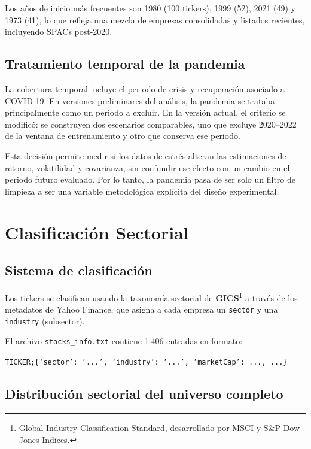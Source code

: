 Los años de inicio más frecuentes son 1980 (100 tickers), 1999 (52),
2021 (49) y 1973 (41), lo que refleja una mezcla de empresas consolidadas
y listados recientes, incluyendo SPACs post-2020.

\subsection*{Tratamiento temporal de la pandemia}

La cobertura temporal incluye el periodo de crisis y recuperación asociado a
COVID-19. En versiones preliminares del análisis, la pandemia se trataba
principalmente como un periodo a excluir. En la versión actual, el criterio se
modificó: se construyen dos escenarios comparables, uno que excluye 2020--2022
de la ventana de entrenamiento y otro que conserva ese periodo.

Esta decisión permite medir si los datos de estrés alteran las estimaciones de
retorno, volatilidad y covarianza, sin confundir ese efecto con un cambio en el
periodo futuro evaluado. Por lo tanto, la pandemia pasa de ser solo un filtro
de limpieza a ser una variable metodológica explícita del diseño experimental.

\section*{Clasificación Sectorial}

\subsection*{Sistema de clasificación}

Los tickers se clasifican usando la taxonomía sectorial de
\textbf{GICS}\footnote{Global Industry Classification Standard,
desarrollado por MSCI y S\&P Dow Jones Indices.}
a través de los metadatos de Yahoo Finance, que asigna a cada empresa
un \texttt{sector} y una \texttt{industry} (subsector).

El archivo \texttt{stocks\_info.txt} contiene 1.406 entradas en formato:

\begin{center}
  \texttt{TICKER;\{`sector': `...', `industry': `...', `marketCap': ..., ...\}}
\end{center}

\subsection*{Distribución sectorial del universo completo}

